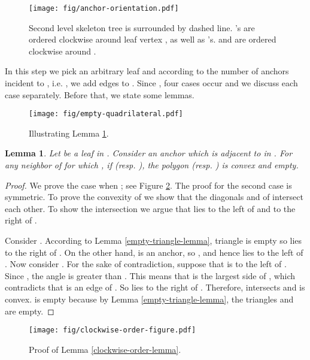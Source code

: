 \documentclass[11pt,a4paper]{article}
\newtheorem{lemma}{Lemma}
\begin{document}
\begin{figure}[ht]
  \centering
    \texttt{[image: fig/anchor-orientation.pdf]}
  \caption{Second level skeleton tree  is surrounded by dashed line. 's are ordered clockwise around leaf vertex , as well as 's.  and  are ordered clockwise around .}
\label{anchor-orientation}
\end{figure}

In this step we pick an arbitrary leaf  and according to the number of anchors incident to , i.e. , we 
add edges to . Since , four cases occur and we discuss each case separately. Before that, we state some lemmas.

\begin{figure}[ht]
  \centering
    \texttt{[image: fig/empty-quadrilateral.pdf]}
  \caption{Illustrating Lemma \ref{empty-quadrilateral-lemma}.}
\label{empty-quadrilateral-fig}
\end{figure}

\begin{lemma}
\label{empty-quadrilateral-lemma}
Let  be a leaf in . Consider an anchor  which is adjacent to  in . For any neighbor  of  for which , if  (resp. ), the polygon  (resp. ) is convex and empty.
\end{lemma}
\begin{proof}
We prove the case when ; see Figure \ref{empty-quadrilateral-fig}. The proof for the second case is symmetric. To prove the convexity of  we show that the diagonals  and  of  intersect each other. To show the intersection we argue that  lies to the left of  and to the right of .

Consider . According to Lemma \ref{empty-triangle-lemma}, triangle  is empty so  lies to the right  of . On the other hand,  is an anchor, so , and hence  lies to the left of .
Now consider . For the sake of contradiction, suppose that  is to the left of . Since , the angle  is greater than . This means that  is the largest side of , which contradicts that  is an edge of . So  lies to the right of . Therefore,  intersects  and  is convex.  is empty because by Lemma \ref{empty-triangle-lemma}, the triangles  and  are empty. 
\end{proof}

\begin{figure}[ht]
  \centering
    \texttt{[image: fig/clockwise-order-figure.pdf]}
  \caption{Proof of Lemma \ref{clockwise-order-lemma}.}
\label{clockwise-order-fig}
\end{figure}
\end{document}
